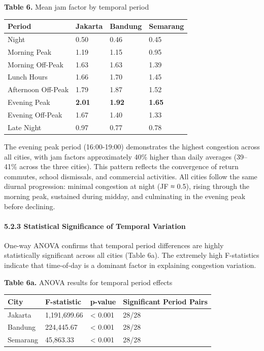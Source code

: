 \documentclass[
  12pt,
]{article}
\begin{document}
\textbf{Table 6.} Mean jam factor by temporal period

\begin{longtable}[]{@{}llll@{}}
\toprule\noalign{}
Period & Jakarta & Bandung & Semarang \\
\midrule\noalign{}
\endhead
\bottomrule\noalign{}
\endlastfoot
Night & 0.50 & 0.46 & 0.45 \\
Morning Peak & 1.19 & 1.15 & 0.95 \\
Morning Off-Peak & 1.63 & 1.63 & 1.39 \\
Lunch Hours & 1.66 & 1.70 & 1.45 \\
Afternoon Off-Peak & 1.79 & 1.87 & 1.52 \\
Evening Peak & \textbf{2.01} & \textbf{1.92} & \textbf{1.65} \\
Evening Off-Peak & 1.67 & 1.40 & 1.33 \\
Late Night & 0.97 & 0.77 & 0.78 \\
\end{longtable}

The evening peak period (16:00-19:00) demonstrates the highest congestion across all cities, with jam factors approximately 40\% higher than daily averages (39--41\% across the three cities). This pattern reflects the convergence of return commutes, school dismissals, and commercial activities. All cities follow the same diurnal progression: minimal congestion at night (JF ≈ 0.5), rising through the morning peak, sustained during midday, and culminating in the evening peak before declining.

\paragraph{5.2.3 Statistical Significance of Temporal Variation}\label{statistical-significance-of-temporal-variation}

One-way ANOVA confirms that temporal period differences are highly statistically significant across all cities (Table 6a). The extremely high F-statistics indicate that time-of-day is a dominant factor in explaining congestion variation.

\textbf{Table 6a.} ANOVA results for temporal period effects

\begin{longtable}[]{@{}llll@{}}
\toprule\noalign{}
City & F-statistic & p-value & Significant Period Pairs \\
\midrule\noalign{}
\endhead
\bottomrule\noalign{}
\endlastfoot
Jakarta & 1,191,699.66 & \textless{} 0.001 & 28/28 \\
Bandung & 224,445.67 & \textless{} 0.001 & 28/28 \\
Semarang & 45,863.33 & \textless{} 0.001 & 28/28 \\
\end{longtable}
\end{document}
